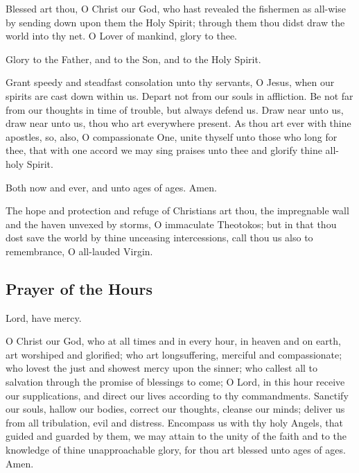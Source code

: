 
Blessed art thou, O Christ our God, who hast revealed the fishermen as all-wise by sending down upon them the Holy Spirit; through them thou didst draw the world into thy net. O Lover of mankind, glory to thee.

Glory to the Father, and to the Son, and to the Holy Spirit.

Grant speedy and steadfast consolation unto thy servants, O Jesus, when our spirits are cast down within us. Depart not from our souls in affliction. Be not far from our thoughts in time of trouble, but always defend us. Draw near unto us, draw near unto us, thou who art everywhere present. As thou art ever with thine apostles, so, also, O compassionate One, unite thyself unto those who long for thee, that with one accord we may sing praises unto thee and glorify thine all-holy Spirit.

Both now and ever, and unto ages of ages. Amen.

The hope and protection and refuge of Christians art thou, the impregnable wall and the haven unvexed by storms, O immaculate Theotokos; but in that thou dost save the world by thine unceasing intercessions, call thou us also to remembrance, O all-lauded Virgin.


\subsection{Prayer of the Hours}

Lord, have mercy. 

O Christ our God, who at all times and in every hour, in heaven and on earth, art worshiped and glorified; who art longsuffering, merciful and compassionate; who lovest the just and showest mercy upon the sinner; who callest all to salvation through the promise of blessings to come; O Lord, in this hour receive our supplications, and direct our lives according to thy commandments. Sanctify our souls, hallow our bodies, correct our thoughts, cleanse our minds; deliver us from all tribulation, evil and distress. Encompass us with thy holy Angels, that guided and guarded by them, we may attain to the unity of the faith and to the knowledge of thine unapproachable glory, for thou art blessed unto ages of ages. Amen.

